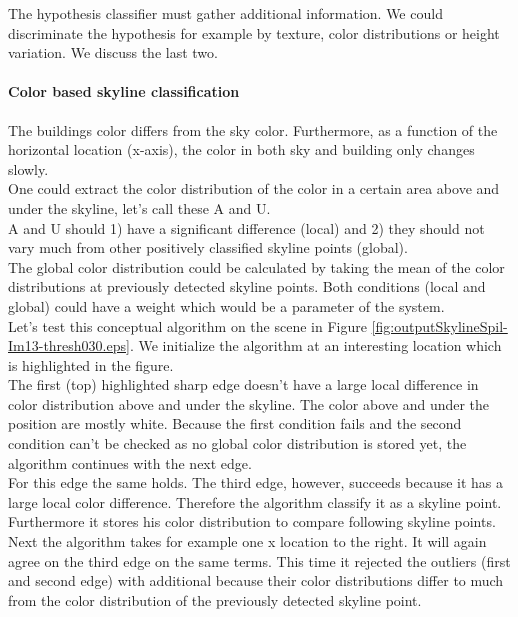 The hypothesis classifier must gather additional information. We could
discriminate the hypothesis for example by texture, color distributions or height
variation. We discuss the last two.

\newpage
\paragraph{Color based skyline classification}
\label{sec:inspired}
The buildings color differs from the sky color. Furthermore,
as a function of the horizontal location (x-axis), the color in both sky and
building only changes slowly.\\

One could extract the color distribution of the color in a certain area above
and under the skyline, let's call these A and U. \\
A and U should 1) have a significant difference (local) and 2) they should not vary much from 
other positively classified skyline points (global).\\

The global color distribution could be calculated by taking the mean of the
color distributions at previously detected skyline points.  Both conditions
(local and global) could have a weight which would be a parameter of the
system.\\

Let's test this conceptual algorithm on the scene in Figure
\ref{fig:outputSkylineSpil-Im13-thresh030.eps}.  We initialize the algorithm at
an interesting location which is highlighted in the figure.\\
The first (top) highlighted sharp edge doesn't have a large local difference in color distribution
above and under the skyline. The color above and under the position are mostly
white. Because the first condition fails and the second condition can't be
checked as no global color distribution is stored yet, the algorithm continues
with the next edge.\\
For this edge the same holds.
The third edge, however, succeeds because it has a large local color difference.
Therefore the algorithm classify it as a skyline point.
Furthermore it stores his color distribution to compare following skyline points.
Next the algorithm takes for example one x
location to the right.  It will again agree on the third edge on the same terms.
This time it rejected the outliers (first and second edge) with additional
because their color distributions differ to much from the color
distribution of the previously detected skyline point.\\

